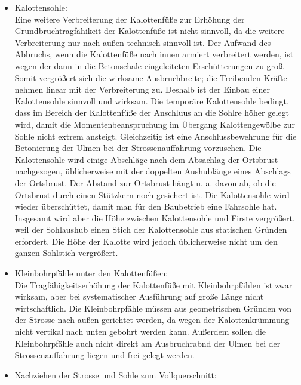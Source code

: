 \documentclass[fleqn,twoside]{article}
\begin{document}
\begin{small}
\begin{itemize}
\begin{itemize}[label={$\blacktriangleright$}]
        \item Kalottensohle:\\
        Eine weitere Verbreiterung der Kalottenfüße zur Erhöhung der Grundbruchtragfähikeit der Kalottenfüße ist nicht sinnvoll, da die weitere Verbreiterung nur nach außen technisch sinnvoll ist. Der Aufwand des Abbruchs, wenn die Kalottenfüße nach innen armiert verbreitert werden, ist wegen der dann in die Betonschale eingeleiteten Erschütterungen zu groß. Somit vergrößert sich die wirksame Ausbruchbreite; die Treibenden Kräfte nehmen linear mit der Verbreiterung zu. Deshalb ist der Einbau einer Kalottensohle sinnvoll und wirksam. Die temporäre Kalottensohle bedingt, dass im Bereich der Kalottenfüße der Anschluus an die Sohlre höher gelegt wird, damit die Momentenbeanspruchung im Übergang Kalottengewölbe zur Sohle nicht extrem ansteigt. Gleichzeitig ist eine Anschlussbewehrung für die Betonierung der Ulmen bei der Strossenauffahrung vorzusehen. Die Kalottensohle wird einige Abschläge nach dem Absachlag der Ortsbrust nachgezogen, üblicherweise mit der doppelten Aushublänge eines Abschlags der Ortsbrust. Der Abstand zur Ortsbrust hängt u. a. davon ab, ob die Ortsbrust durch einen Stützkern noch gesichert ist. Die Kalottensohle wird wieder überschüttet, damit man für den Baubetrieb eine Fahrsohle hat. Insgesamt wird aber die Höhe zwischen Kalottensohle und Firste vergrößert, weil der Sohlaushub einen Stich der Kalottensohle aus statischen Gründen erfordert. Die Höhe der Kalotte wird jedoch üblicherweise nicht um den ganzen Sohlstich vergrößert.
        \item Kleinbohrpfähle unter den Kalottenfüßen:\\
        Die Tragfähigkeitserhöhung der Kalottenfüße mit Kleinbohrpfählen ist zwar wirksam, aber bei systematischer Ausführung auf große Länge nicht wirtschaftlich. Die Kleinbohrpfähle müssen aus geometrischen Gründen von der Strosse nach außen gerichtet werden, da wegen der Kalottenkrümmung nicht vertikal nach unten gebohrt werden kann. Außerdem sollen die Kleinbohrpfähle auch nicht direkt am Ausbruchrabnd der Ulmen bei der Strossenauffahrung liegen und frei gelegt werden.
        \item Nachziehen der Strosse und Sohle zum Vollquerschnitt:\\

\end{itemize}
\end{itemize}
\end{small}
\end{document}
